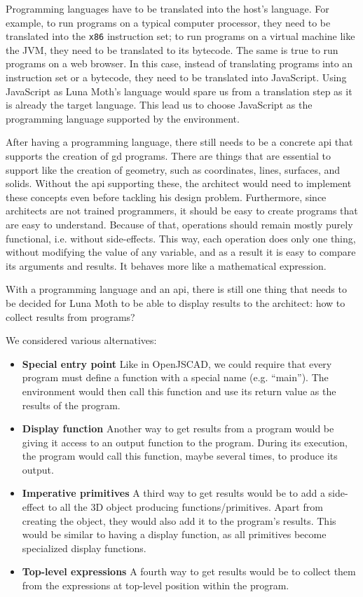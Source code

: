Programming languages have to be translated into the host's language.
For example, to run programs on a typical computer processor, they need to be translated into the {\tt x86} instruction set; to run programs on a virtual machine like the JVM, they need to be translated to its bytecode.
The same is true to run programs on a web browser.
In this case, instead of translating programs into an instruction set or a bytecode, they need to be translated into JavaScript.
Using JavaScript as Luna Moth's language would spare us from a translation step as it is already the target language.
This lead us to choose JavaScript as the programming language supported by the environment.

After having a programming language, there still needs to be a concrete \gls{api} that supports the creation of \gls{gd} programs.
There are things that are essential to support like the creation of geometry, such as coordinates, lines, surfaces, and solids.
Without the \gls{api} supporting these, the architect would need to implement these concepts even before tackling his design problem.
Furthermore, since architects are not trained programmers, it should be easy to create programs that are easy to understand.
Because of that, operations should remain mostly purely functional, i.e. without side-effects.
This way, each operation does only one thing, without modifying the value of any variable, and as a result it is easy to compare its arguments and results.
It behaves more like a mathematical expression.

With a programming language and an \gls{api}, there is still one thing that needs to be decided for Luna Moth to be able to display results to the architect:
how to collect results from programs?

We considered various alternatives:
\begin{itemize}
  \item {\bf Special entry point} Like in OpenJSCAD, we could require that every program must define a function with a special name (e.g. ``main'').
  The environment would then call this function and use its return value as the results of the program.

  \item {\bf Display function} Another way to get results from a program would be giving it access to an output function to the program.
  During its execution, the program would call this function, maybe several times, to produce its output.

  \item {\bf Imperative primitives} A third way to get results would be to add a side-effect to all the 3D object producing functions/primitives.
  Apart from creating the object, they would also add it to the program's results.
  This would be similar to having a display function, as all primitives become specialized display functions.

  \item {\bf Top-level expressions} A fourth way to get results would be to collect them from the expressions at top-level position within the program.
\end{itemize}

